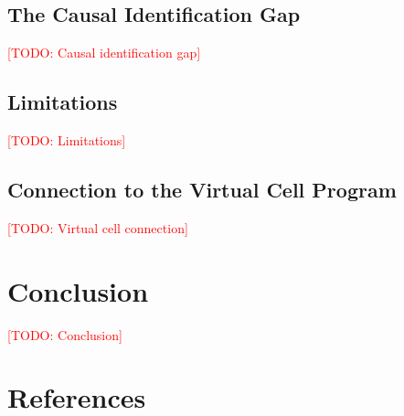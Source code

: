 \documentclass[11pt]{article}
\newcommand{\todo}[1]{\textcolor{red}{[TODO: #1]}}
\begin{document}
\subsection{The Causal Identification Gap}
\todo{Causal identification gap}

\subsection{Limitations}
\todo{Limitations}

\subsection{Connection to the Virtual Cell Program}
\todo{Virtual cell connection}

\section{Conclusion}
\todo{Conclusion}

\section*{References}


\end{document}
